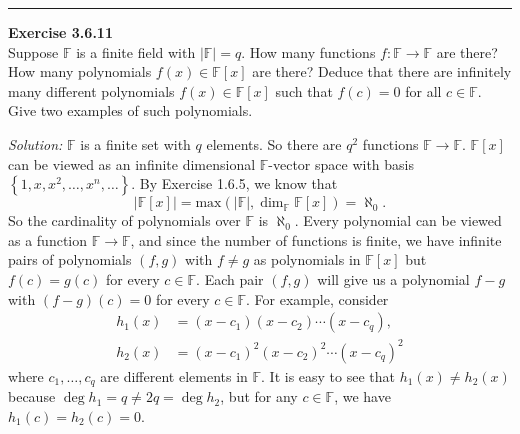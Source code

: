 \documentclass[a4paper, 12pt]{article}
\newenvironment{problem}[2][Exercise]
    { \begin{mdframed}[backgroundcolor=gray!20] \textbf{#1 #2} \\}
    {  \end{mdframed}}
\newenvironment{solution}
    {\textit{Solution:}}
    {}
\begin{document}
\noindent\rule{7in}{2.8pt}
\begin{problem}{3.6.11}
Suppose \(\mathbb{F}\) is a finite field with \(|\mathbb{F}|=q\). How many functions \(f:\mathbb{F}\rightarrow \mathbb{F}\) are there? How many polynomials \(f(x)\in \mathbb{F}[x]\) are there? Deduce that 
there are infinitely many different polynomials \(f(x)\in \mathbb{F}[x]\) such that \(f(c)=0\) for all \(c\in \mathbb{F}\). Give two examples of such polynomials.
\end{problem}
\begin{solution}
\(\mathbb{F}\) is a finite set with \(q\) elements. So there are \(q^2\) functions \(\mathbb{F}\rightarrow \mathbb{F}\). \(\mathbb{F}[x]\) can be viewed as an infinite dimensional \(\mathbb{F}\)-vector space with basis 
\(\left\{ 1,x,x^2,\ldots,x^n,\ldots \right\}\). By Exercise 1.6.5, we know that 
\[|\mathbb{F}[x]|=\text{max}(|\mathbb{F}|,\dim_{\mathbb{F}}\mathbb{F}[x])=\aleph_0.\]
So the cardinality of polynomials over \(\mathbb{F}\) is \(\aleph_0\). Every polynomial can be viewed as a function \(\mathbb{F}\rightarrow \mathbb{F}\), and since the number of functions is finite, we have infinite pairs of polynomials 
\((f,g)\) with \(f\neq g\) as polynomials in \(\mathbb{F}[x]\) but \(f(c)=g(c)\) for every \(c\in \mathbb{F}\). Each pair \((f,g)\) will give us a polynomial \(f-g\) with \((f-g)(c)=0\) for every \(c\in \mathbb{F}\). For example, consider 
\begin{align*}
    h_1(x)&=(x-c_1)(x-c_2)\cdots(x-c_q),\\
    h_2(x)&=(x-c_1)^2(x-c_2)^2\cdots(x-c_q)^2
\end{align*}
where \(c_1,\ldots,c_q\) are different elements in \(\mathbb{F}\). It is easy to see that \(h_1(x)\neq h_2(x)\) because \(\deg h_1=q\neq 2q=\deg h_2\), but for any \(c\in \mathbb{F}\), we have \(h_1(c)=h_2(c)=0\).
\end{solution}
\end{document}
